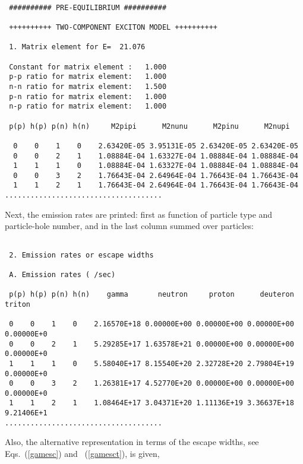 \begin{samplecase}
{\small \begin{verbatim}

 ########## PRE-EQUILIBRIUM ##########                      
                     
 ++++++++++ TWO-COMPONENT EXCITON MODEL ++++++++++
                               
 1. Matrix element for E=  21.076        
                                        
 Constant for matrix element :   1.000                                          
 p-p ratio for matrix element:   1.000
 n-n ratio for matrix element:   1.500                                          
 p-n ratio for matrix element:   1.000
 n-p ratio for matrix element:   1.000
 
 p(p) h(p) p(n) h(n)     M2pipi      M2nunu      M2pinu      M2nupi
 
  0    0    1    0    2.63420E-05 3.95131E-05 2.63420E-05 2.63420E-05
  0    0    2    1    1.08884E-04 1.63327E-04 1.08884E-04 1.08884E-04
  1    1    1    0    1.08884E-04 1.63327E-04 1.08884E-04 1.08884E-04
  0    0    3    2    1.76643E-04 2.64964E-04 1.76643E-04 1.76643E-04
  1    1    2    1    1.76643E-04 2.64964E-04 1.76643E-04 1.76643E-04
.....................................
\end{verbatim} } \renewcommand{\baselinestretch}{1.07}\small\normalsize
\noindent
Next, the emission 
rates are printed: first as function of particle type and particle-hole number,
and in the last column summed over particles:

{\small \begin{verbatim}

 2. Emission rates or escape widths

 A. Emission rates ( /sec)

 p(p) h(p) p(n) h(n)    gamma       neutron     proton      deuteron    triton  

 0    0    1    0    2.16570E+18 0.00000E+00 0.00000E+00 0.00000E+00 0.00000E+0
 0    0    2    1    5.29285E+17 1.63578E+21 0.00000E+00 0.00000E+00 0.00000E+0
 1    1    1    0    5.58040E+17 8.15540E+20 2.32728E+20 2.79804E+19 0.00000E+0
 0    0    3    2    1.26381E+17 4.52770E+20 0.00000E+00 0.00000E+00 0.00000E+0
 1    1    2    1    1.08464E+17 3.04371E+20 1.11136E+19 3.36637E+18 9.21406E+1
.....................................
\end{verbatim} } \renewcommand{\baselinestretch}{1.07}\small\normalsize
\noindent
Also, the alternative representation in terms of the escape widths, see
Eqs.~(\ref{gamesc}) and ~(\ref{gamesct}), is given,


\end{samplecase}
